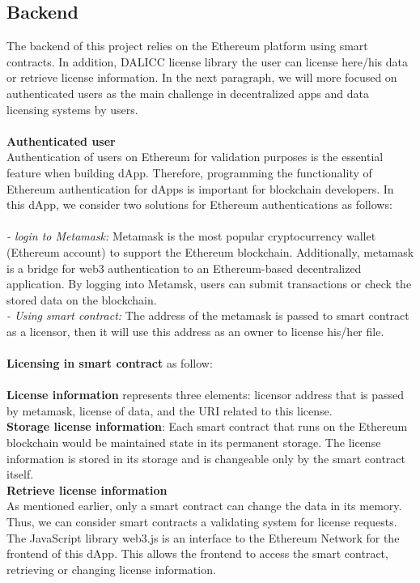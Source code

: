 \subsection{Backend} The backend of this project relies on the Ethereum platform using smart contracts. In addition, DALICC license library the user can license here/his data or retrieve license information. In the next paragraph, we will more focused on authenticated users as the main challenge in decentralized apps and data licensing systems by users. \\
\\
\textbf{Authenticated user} \\
Authentication of users on Ethereum for validation purposes is the essential feature when building dApp.  Therefore, programming the functionality of Ethereum authentication for dApps is important for blockchain developers. 
In this dApp, we consider two solutions for Ethereum authentications as follows: \\
\\
\textit{- login to Metamask:} Metamask is the most popular cryptocurrency wallet (Ethereum account) to support the Ethereum blockchain. Additionally, metamask is a bridge for web3 authentication to an Ethereum-based decentralized application. By logging into Metamsk, users can submit transactions or check the stored data on the blockchain.\\
\textit{- Using smart contract: } The address of the metamask is passed to smart contract as a licensor, then it will
use this address as an owner to license his/her file. \\
\\
\textbf{Licensing in smart contract} as follow: \\
\\
\textbf{License information} represents three elements: licensor address that is passed by metamask, license of data, and the URI related to this license.\\
\textbf{Storage license information}: Each smart contract that runs on the Ethereum blockchain would be maintained state in its permanent storage. The license information is stored in its storage and is changeable only by the smart contract itself.\\
\textbf{Retrieve license information}\\
As mentioned earlier, only a smart contract can change the data in its memory. Thus, we can consider smart contracts a validating system for license requests. The JavaScript
library web3.js is an interface to the Ethereum Network for the frontend of this dApp. This allows the frontend to access the smart contract, retrieving or changing license information.\\


